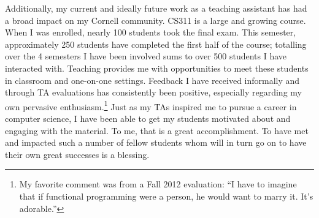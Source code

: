 \documentclass{article}
\begin{document}
Additionally, my current and ideally future work as a teaching assistant has had a broad impact on my Cornell community. 
CS311 is a large and growing course.
When I was enrolled, nearly 100 students took the final exam.
This semester, approximately 250 students have completed the first half of the course; totalling over the 4 semesters I have been involved sums to over 500 students I have interacted with.
Teaching provides me with opportunities to meet these students in classroom and one-on-one settings.
Feedback I have received informally and through TA evaluations has consistently been positive, especially regarding my own pervasive enthusiasm.\footnote{My favorite comment was from a Fall 2012 evaluation: ``I have to imagine that if functional programming were a person, he would want to marry it. It's adorable.''}
Just as my TAs inspired me to pursue a career in computer science, I have been able to get my students motivated about and engaging with the material.
To me, that is a great accomplishment.
To have met and impacted such a number of fellow students whom will in turn go on to have their own great successes is a blessing.

\end{document}
